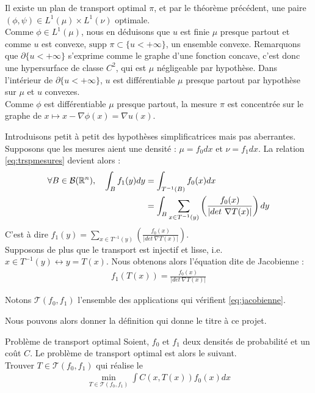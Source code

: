 \documentclass[a4paper,12pt]{article}
\newcommand{\supp}{\text{supp }}
\begin{document}
\begin{preuve}
Il existe un plan de transport optimal $\pi$, et par le théorème précédent, une paire $(\phi,\psi)\in L^1(\mu)\times L^1(\nu)$ optimale. \\
Comme $\phi\in L^1(\mu)$, nous en déduisons que $u$ est finie $\mu$ presque partout et comme $u$ est convexe, $\supp\pi\subset \{u<+\infty\}$, un ensemble convexe. Remarquons que $\partial \{u<+\infty\}$ s'exprime comme le graphe d'une fonction concave, c'est donc une hypersurface de classe $C^2$, qui est $\mu$ négligeable par hypothèse. Dans l'intérieur de $\partial \{u<+\infty\}$, $u$ est différentiable $\mu$ presque partout par hypothèse sur $\mu$ et $u$ convexes. \\
Comme $\phi$ est différentiable $\mu$ presque partout, la mesure $\pi$ est concentrée sur le graphe de $x\mapsto x-\nabla\phi(x)=\nabla u(x)$.
\end{preuve}



 

\newpage


Introduisons petit à petit des hypothèses simplificatrices mais pas aberrantes. Supposons que les mesures aient une densité : $\mu = f_0 dx$ et $\nu = f_1 dx$. La relation \eqref{eq:trspmesures} devient alors : 
\begin{align*}
\forall B \in\mathcal{B}(\mathbb{R}^n),\quad \int_B f_1(y)dy&=\int_{T^{-1}(B)} f_0(x) dx \\
&= \int_B \sum_{x\in T^{-1}(y)} \left(\frac{f_0(x)}{|det\ \nabla T(x)|}\right)dy\\
\end{align*}
C'est à dire $f_1(y) = \sum_{x\in T^{-1}(y)} \left(\frac{f_0(x)}{|det\ \nabla T(x)|}\right)$.\\
Supposons de plus que le transport est injectif et lisse, i.e. $x\in T^{-1}(y) \leftrightarrow y=T(x)$. Nous obtenons alors l'équation dite de Jacobienne : 
\begin{align}
f_1(T(x)) = \frac{f_0(x)}{|det\ \nabla T(x)|}
\label{eq:jacobienne}
\end{align}

Notons $\mathcal{T}(f_0,f_1)$ l'ensemble des applications qui vérifient \eqref{eq:jacobienne}.



Nous pouvons alors donner la définition qui donne le titre à ce projet. 
\begin{definition}{Problème de transport optimal}
Soient, $f_0$ et $f_1$ deux densités de probabilité et un coût $C$. Le problème de transport optimal est alors le suivant.\\
Trouver $T\in\mathcal{T}(f_0,f_1)$ qui réalise le 
\begin{align}
\min_{T\in\mathcal{T}(f_0,f_1)} \int C(x,T(x)) f_0(x)dx
\label{eq:trspOpt}
\end{align}
\end{definition}
\end{document}
